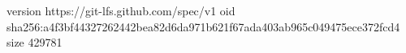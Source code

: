 version https://git-lfs.github.com/spec/v1
oid sha256:a4f3bf44327262442bea82d6da971b621f67ada403ab965c049475ece372fcd4
size 429781
